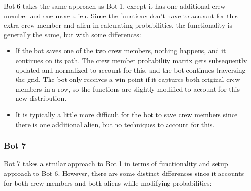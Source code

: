 \documentclass[11pt]{article}
\begin{document}
Bot 6 takes the same approach as Bot 1, except it has one additional crew member and one more alien. Since the functions don't have to account for this extra crew member and alien in calculating probabilities, the functionality is generally the same, but with some differences:

\begin{itemize}
    \item If the bot saves one of the two crew members, nothing happens, and it continues on its path. The crew member probability matrix gets subsequently updated and normalized to account for this, and the bot continues traversing the grid. The bot only receives a win point if it captures both original crew members in a row, so the functions are slightly modified to account for this new distribution.
    \item It is typically a little more difficult for the bot to save crew members since there is one additional alien, but no techniques to account for this.
\end{itemize}

\subsubsection{Bot 7}

Bot 7 takes a similar approach to Bot 1 in terms of functionality and setup approach to Bot 6. However, there are some distinct differences since it accounts for both crew members and both aliens while modifying probabilities:
\end{document}
